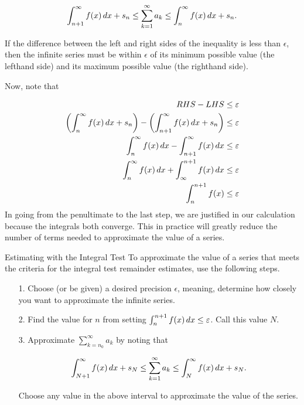 \documentclass{ximera}
\begin{document}
\[
\int_{n+1}^\infty f(x) \mathop{}\!d x  +s_n \leq \sum_{k=1}^{\infty} a_k \leq \int_{n}^\infty f(x) \mathop{}\!d x  +s_n.
\]
 
If the difference between the left and right sides of the inequality is less than $\epsilon$, then the infinite series must be within $\epsilon$ of its minimum possible value (the lefthand side) and its maximum possible value (the righthand side).
 
Now, note that

\begin{align*}
RHS-LHS &\leq \varepsilon \\
\left( \int_{n}^\infty f(x) \mathop{}\!d x  +s_n\right) - \left( \int_{n+1}^\infty f(x) \mathop{}\!d x  +s_n \right) &\leq \varepsilon \\
 \int_{n}^\infty f(x) \mathop{}\!d x  - \int_{n+1}^\infty f(x) \mathop{}\!d x   &\leq \varepsilon \\
  \int_{n}^\infty f(x) \mathop{}\!d x  +  \int_{\infty}^{n+1} f(x) \mathop{}\!d x   &\leq \varepsilon \\
    \int_{n}^{n+1} f(x)  &\leq \varepsilon \\
\end{align*} 
In going from the penultimate to the last step, we are justified in our calculation because the integrals both converge.  This in practice will greatly reduce the number of terms needed to approximate the value of a series.

\begin{procedure}{Estimating with the Integral Test}
To approximate the value of a series that meets the criteria for the integral test remainder estimates, use the following steps.

\begin{itemize}
\item[1.] Choose (or be given) a desired precision $\epsilon$, meaning, determine how closely you want to approximate the infinite series.
\item[2.] Find the value for $n$ from setting $\int_n^{n+1} f(x) \mathop{}\!d x \leq \varepsilon$.  Call this value $N$.
\item[3.] Approximate $\sum_{k=n_0}^{\infty} a_k$ by noting that 

\[
\int_{N+1}^\infty f(x) \mathop{}\!d x  +s_N \leq \sum_{k=1}^{\infty} a_k \leq \int_{N}^\infty f(x) \mathop{}\!d x  +s_N.
\]

Choose any value in the above interval to approximate the value of the series.  
\end{itemize}

\end{procedure}
\end{document}
